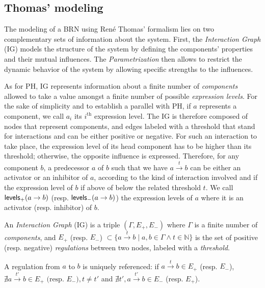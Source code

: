 \subsection{Thomas' modeling}

The modeling of a BRN using René Thomas' formalism lies on two complementary sets of information about the system. First, the \emph{Interaction Graph} (IG) models the structure of the system by defining the components' properties and their mutual influences. The \emph{Parametrization} then allows to restrict the dynamic behavior of the system by allowing specific strengths to the influences.

As for PH, IG represents information about a finite number of \emph{components} allowed to take a value amongst a finite number of possible \emph{expression levels}.
For the sake of simplicity and to establish a parallel with PH, if $a$ represents a component, we call $a_i$ its $i^\text{th}$ expression level.
The IG is therefore composed of nodes that represent components, and edges labeled with a threshold that stand for interactions and can be either positive or negative.
For such an interaction to take place, the expression level of its head component has to be higher than its threshold; otherwise, the opposite influence is expressed.
Therefore, for any component $b$, a predecessor $a$ of $b$ such that we have $a \xrightarrow{t} b$ can be either an activator or an inhibitor of $a$, according to the kind of interaction involved and if the expression level of $b$ if above of below the related threshold $t$.
We call $\mathsf{levels}_+(a\rightarrow b)$ (resp. $\mathsf{levels}_-(a\rightarrow b)$) the expression levels of $a$ where it is an activator (resp. inhibitor) of $b$.

\begin{definition}
\label{def:ig}
An \emph{Interaction Graph} (IG) is a triple $(\Gamma, E_+, E_-)$ where $\Gamma$ is a finite number of \emph{components},
and $E_+$ (resp. $E_-$) $\subset \{a \xrightarrow{t} b \mid a, b \in \Gamma \wedge t \in \mathbb{N}\}$
is the set of positive (resp. negative) \emph{regulations} between two nodes, labeled with a \emph{threshold}.

A regulation from $a$ to $b$ is uniquely referenced:
if $a \xrightarrow{t} b \in E_+$ (resp. $E_-$),
$\nexists a \xrightarrow{t'} b \in E_+ \text{ (resp. $E_-$)}, t \neq t'$
and $\nexists t', a \xrightarrow{t'} b \in E_-$ (resp. $E_+$).
\end{definition}


